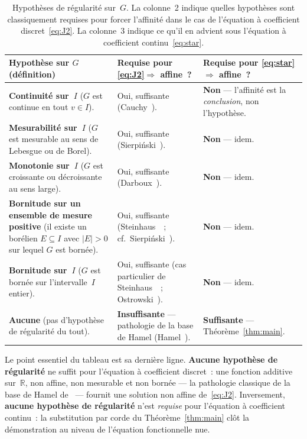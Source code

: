 \documentclass[11pt,a4paper]{amsart}
\newcommand{\R}{\mathbb R}
\begin{document}
\begin{table}[ht]
\renewcommand{\arraystretch}{1.4}
\begin{tabularx}{\textwidth}{@{} X | X | X @{}}
\toprule
\textbf{Hypothèse sur $G$ (définition)} & \textbf{Requise pour
\eqref{eq:J2}$\Rightarrow$ affine~?} & \textbf{Requise pour
\eqref{eq:star}$\Rightarrow$ affine~?}\\
\midrule
\textbf{Continuité sur~$I$} ($G$ est continue en tout $v\in I$).
& Oui, suffisante (Cauchy~\cite{Cauchy1821}).
& \textbf{Non} --- l'affinité est la \emph{conclusion}, non l'hypothèse.\\
\midrule
\textbf{Mesurabilité sur~$I$} ($G$ est mesurable au sens de Lebesgue ou
de Borel).
& Oui, suffisante (Sierpiński~\cite{Sierpinski1920}).
& \textbf{Non} --- idem.\\
\midrule
\textbf{Monotonie sur~$I$} ($G$ est croissante ou décroissante au sens
large).
& Oui, suffisante (Darboux~\cite{Darboux1875}).
& \textbf{Non} --- idem.\\
\midrule
\textbf{Bornitude sur un ensemble de mesure positive} (il existe un
borélien $E\subseteq I$ avec $|E|>0$ sur lequel $G$ est bornée).
& Oui, suffisante (Steinhaus~\cite{Steinhaus1920}~;
cf.~Sierpiński~\cite{Sierpinski1920}).
& \textbf{Non} --- idem.\\
\midrule
\textbf{Bornitude sur~$I$} ($G$ est bornée sur l'intervalle~$I$ entier).
& Oui, suffisante (cas particulier de Steinhaus~\cite{Steinhaus1920}~;
Ostrowski~\cite{Ostrowski1929}).
& \textbf{Non} --- idem.\\
\midrule
\textbf{Aucune} (pas d'hypothèse de régularité du tout).
& \textbf{Insuffisante} --- pathologie de la base de Hamel
(Hamel~\cite{Hamel1905}).
& \textbf{Suffisante} --- Théorème~\ref{thm:main}.\\
\bottomrule
\end{tabularx}
\caption{Hypothèses de régularité sur~$G$. La colonne~2 indique quelles
hypothèses sont classiquement requises pour forcer l'affinité dans le cas
de l'équation à coefficient discret~\eqref{eq:J2}. La colonne~3 indique ce
qu'il en advient sous l'équation à coefficient continu~\eqref{eq:star}.}
\label{tab:dictionary}
\end{table}

Le point essentiel du tableau est sa dernière ligne. \textbf{Aucune
hypothèse de régularité} ne suffit pour l'équation à coefficient discret~:
une fonction additive sur~$\R$, non affine, non mesurable et non bornée
--- la pathologie classique de la base de Hamel de~\cite{Hamel1905} ---
fournit une solution non affine de~\eqref{eq:J2}. Inversement,
\textbf{aucune hypothèse de régularité} n'est \emph{requise} pour
l'équation à coefficient continu~: la substitution par corde du
Théorème~\ref{thm:main} clôt la démonstration au niveau de l'équation
fonctionnelle nue.
\end{document}
